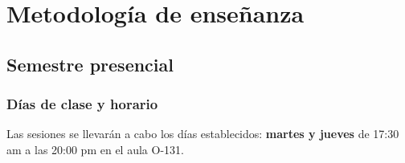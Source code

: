\documentclass[12pt]{beamer}
\begin{document}
\section{Metodología de enseñanza}
\subsection{Semestre presencial}

\begin{frame}
\frametitle{Días de clase y horario}
Las sesiones se llevarán a cabo los días establecidos: \textbf{martes y jueves} de 17:30 am a las 20:00 pm en el aula O-131.
\end{frame}

\end{document}
